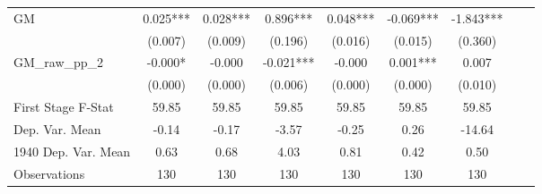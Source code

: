 \begin{tabular}{l*{8}{c}}
GM              &    0.025***&    0.028***&    0.896***&    0.048***&   -0.069***&   -1.843***\\
                &  (0.007)   &  (0.009)   &  (0.196)   &  (0.016)   &  (0.015)   &  (0.360)   \\
\addlinespace
GM\_raw\_pp\_2     &   -0.000*  &   -0.000   &   -0.021***&   -0.000   &    0.001***&    0.007   \\
                &  (0.000)   &  (0.000)   &  (0.006)   &  (0.000)   &  (0.000)   &  (0.010)   \\
\midrule
First Stage F-Stat&    59.85   &    59.85   &    59.85   &    59.85   &    59.85   &    59.85   \\
Dep. Var. Mean  &    -0.14   &    -0.17   &    -3.57   &    -0.25   &     0.26   &   -14.64   \\
1940 Dep. Var. Mean&     0.63   &     0.68   &     4.03   &     0.81   &     0.42   &     0.50   \\
Observations    &      130   &      130   &      130   &      130   &      130   &      130   \\
       \bottomrule \end{tabular}
